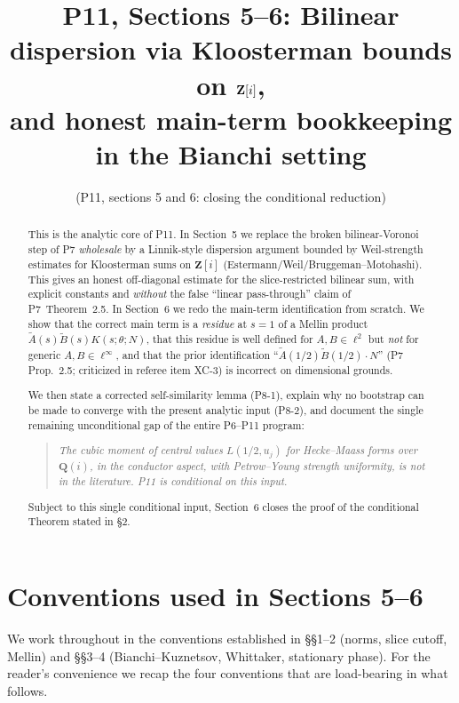 \documentclass[11pt]{article}
\title{P11, Sections 5--6: Bilinear dispersion via Kloosterman bounds on $\Z[i]$,\\
and honest main-term bookkeeping in the Bianchi setting}
\author{(P11, sections 5 and 6: closing the conditional reduction)}
\date{}
\theoremstyle{definition}
\newcommand{\Z}{\mathbf{Z}}
\newcommand{\Q}{\mathbf{Q}}
\begin{document}
\maketitle

\begin{abstract}
This is the analytic core of P11. In Section~5 we replace the broken bilinear-Voronoi step of P7 \emph{wholesale} by a Linnik-style dispersion argument bounded by Weil-strength estimates for Kloosterman sums on $\Z[i]$ (Estermann/Weil/Bruggeman--Motohashi). This gives an honest off-diagonal estimate for the slice-restricted bilinear sum, with explicit constants and \emph{without} the false ``linear pass-through'' claim of P7~Theorem~2.5. In Section~6 we redo the main-term identification from scratch. We show that the correct main term is a \emph{residue} at $s=1$ of a Mellin product $\widetilde A(s)\widetilde B(s)K(s;\theta;N)$, that this residue is well defined for $A,B\in\ell^2$ but \emph{not} for generic $A,B\in\ell^\infty$, and that the prior identification ``$\widetilde A(1/2)\widetilde B(1/2)\cdot N$'' (P7 Prop.\ 2.5; criticized in referee item XC-3) is incorrect on dimensional grounds.

We then state a corrected self-similarity lemma (P8-1), explain why no bootstrap can be made to converge with the present analytic input (P8-2), and document the single remaining unconditional gap of the entire P6--P11 program:

\begin{quote}
\emph{The cubic moment of central values $L(1/2,u_j)$ for Hecke--Maass forms over $\Q(i)$, in the conductor aspect, with Petrow--Young strength uniformity, is not in the literature. P11 is conditional on this input.}
\end{quote}

Subject to this single conditional input, Section~6 closes the proof of the conditional Theorem stated in \S2.
\end{abstract}

\tableofcontents

\section*{Conventions used in Sections 5--6}

We work throughout in the conventions established in \S\S1--2 (norms, slice cutoff, Mellin) and \S\S3--4 (Bianchi--Kuznetsov, Whittaker, stationary phase). For the reader's convenience we recap the four conventions that are load-bearing in what follows.
\end{document}
